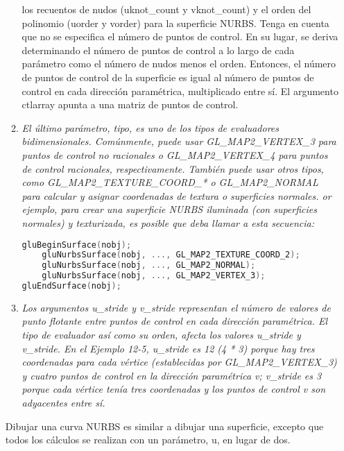 \begin{enumerate}
\begin{enumerate}
{            los recuentos de nudos (uknot\_count y vknot\_count) y el orden
            del polinomio (uorder y vorder) para la superficie NURBS.
            Tenga en cuenta que no se especifica el número de puntos de control. En su lugar, se deriva determinando el número de puntos de control
            a lo largo de cada parámetro como el número de nudos menos el
            orden. Entonces, el número de puntos de control de la superficie
            es igual al número de puntos de control en cada dirección
            paramétrica, multiplicado entre sí. El argumento ctlarray apunta
            a una matriz de puntos de control.
        }
        \item[] \textit{El último parámetro, tipo, es uno de los tipos
            de evaluadores bidimensionales. Comúnmente, puede usar
            GL\_MAP2\_VERTEX\_3 para puntos de control no racionales o
            GL\_MAP2\_VERTEX\_4 para puntos de control racionales,
            respectivamente. También puede usar otros tipos, como
            GL\_MAP2\_TEXTURE\_COORD\_* o GL\_MAP2\_NORMAL para calcular
            y asignar coordenadas de textura o superficies normales.
            or ejemplo, para crear una superficie NURBS iluminada (con
            superficies normales) y texturizada, es posible que deba
            llamar a esta secuencia:
        }
\begin{lstlisting}[language=C++]
gluBeginSurface(nobj);
    gluNurbsSurface(nobj, ..., GL_MAP2_TEXTURE_COORD_2);
    gluNurbsSurface(nobj, ..., GL_MAP2_NORMAL);
    gluNurbsSurface(nobj, ..., GL_MAP2_VERTEX_3);
gluEndSurface(nobj);
\end{lstlisting}
        \item[] \textit{Los argumentos u\_stride y v\_stride representan
            el número de valores de punto flotante entre puntos de control
            en cada dirección paramétrica. El tipo de evaluador
            así como su orden, afecta los valores u\_stride y v\_stride.
            En el Ejemplo 12-5, u\_stride es 12 (4 * 3) porque hay tres
            coordenadas para cada vértice (establecidas por
            GL\_MAP2\_VERTEX\_3) y cuatro puntos de control en la
            dirección paramétrica v; v\_stride es 3 porque cada vértice
            tenía tres coordenadas y los puntos de control v son
            adyacentes entre sí.
        }
    \end{enumerate}
    Dibujar una curva NURBS es similar a dibujar una superficie, excepto
    que todos los cálculos se realizan con un parámetro, u, en lugar de dos.

\end{enumerate}
